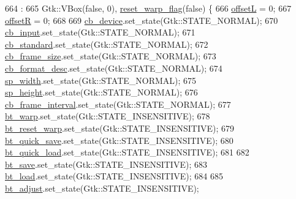 \begin{DoxyCode}
664                                :
665     Gtk::VBox(\textcolor{keyword}{false}, 0), \hyperlink{class_v_s_s_s___g_u_i_1_1_v4_l_interface_aa6cd5079d1f62050205bca10edf667ce}{reset\_warp\_flag}(\textcolor{keyword}{false}) \{
666         \hyperlink{class_v_s_s_s___g_u_i_1_1_v4_l_interface_a4e43fc5295bdec46e8e2fd24bf719e0b}{offsetL} = 0;
667         \hyperlink{class_v_s_s_s___g_u_i_1_1_v4_l_interface_a8bb9caa477b417f549198ea059375f06}{offsetR} = 0;
668 
669         \hyperlink{class_v_s_s_s___g_u_i_1_1_v4_l_interface_a9aebd92fe12b9b5acc25b1113dbd022e}{cb\_device}.set\_state(Gtk::STATE\_NORMAL);
670         \hyperlink{class_v_s_s_s___g_u_i_1_1_v4_l_interface_af7c647eefb3e6f7cf8e0fdc170619922}{cb\_input}.set\_state(Gtk::STATE\_NORMAL);
671         \hyperlink{class_v_s_s_s___g_u_i_1_1_v4_l_interface_ae78aa74f420bbb92b59ff0e0f0ac3b1e}{cb\_standard}.set\_state(Gtk::STATE\_NORMAL);
672         \hyperlink{class_v_s_s_s___g_u_i_1_1_v4_l_interface_ad6dd4704d3b7d1f262843dd148269b73}{cb\_frame\_size}.set\_state(Gtk::STATE\_NORMAL);
673         \hyperlink{class_v_s_s_s___g_u_i_1_1_v4_l_interface_a1f6b2f08ccbc0ecbfba96311ac07aa44}{cb\_format\_desc}.set\_state(Gtk::STATE\_NORMAL);
674         \hyperlink{class_v_s_s_s___g_u_i_1_1_v4_l_interface_a0f492cb2c65c4021c9b9b81f4a185e84}{sp\_width}.set\_state(Gtk::STATE\_NORMAL);
675         \hyperlink{class_v_s_s_s___g_u_i_1_1_v4_l_interface_a7b095a3a9dc7a5895f3bac68b05b8210}{sp\_height}.set\_state(Gtk::STATE\_NORMAL);
676         \hyperlink{class_v_s_s_s___g_u_i_1_1_v4_l_interface_ad07b3bbad672e676e128f19a12f07e73}{cb\_frame\_interval}.set\_state(Gtk::STATE\_NORMAL);
677         \hyperlink{class_v_s_s_s___g_u_i_1_1_v4_l_interface_a6cdcc092c26848cd7009e56084ee1b23}{bt\_warp}.set\_state(Gtk::STATE\_INSENSITIVE);
678         \hyperlink{class_v_s_s_s___g_u_i_1_1_v4_l_interface_af7e670a295f186a699859a285ea1cdbb}{bt\_reset\_warp}.set\_state(Gtk::STATE\_INSENSITIVE);
679         \hyperlink{class_v_s_s_s___g_u_i_1_1_v4_l_interface_a424118f056f71fba97d881f4647f7555}{bt\_quick\_save}.set\_state(Gtk::STATE\_INSENSITIVE);
680         \hyperlink{class_v_s_s_s___g_u_i_1_1_v4_l_interface_a7b72e731fab1a75270726fcd3936521e}{bt\_quick\_load}.set\_state(Gtk::STATE\_INSENSITIVE);
681 
682         \hyperlink{class_v_s_s_s___g_u_i_1_1_v4_l_interface_a961db9f4decd0e940ebd69fbb0cccc61}{bt\_save}.set\_state(Gtk::STATE\_INSENSITIVE);
683         \hyperlink{class_v_s_s_s___g_u_i_1_1_v4_l_interface_a4c726d738e66bc77323a038918d133ce}{bt\_load}.set\_state(Gtk::STATE\_INSENSITIVE);
684 
685         \hyperlink{class_v_s_s_s___g_u_i_1_1_v4_l_interface_a0d17ffdc7f7792c2d37bcda12c700133}{bt\_adjust}.set\_state(Gtk::STATE\_INSENSITIVE);

\end{DoxyCode}
